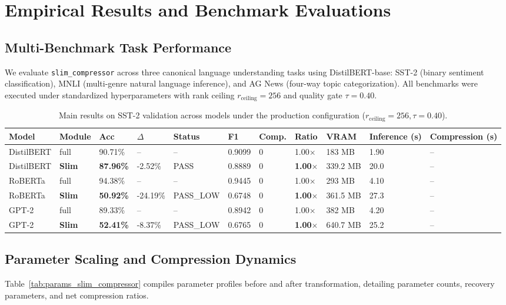 \section{Empirical Results and Benchmark Evaluations}
\label{sec:results}

\subsection{Multi-Benchmark Task Performance}
We evaluate \texttt{slim\_compressor} across three canonical language understanding tasks using DistilBERT-base: SST-2 (binary sentiment classification), MNLI (multi-genre natural language inference), and AG News (four-way topic categorization). All benchmarks were executed under standardized hyperparameters with rank ceiling $r_{\mathrm{ceiling}} = 256$ and quality gate $\tau = 0.40$.

\begin{table}[t]
\centering
\small
\begin{tabular}{lllllllllll}
\toprule
\textbf{Model} & \textbf{Module} & \textbf{Acc} & \textbf{$\Delta$} & \textbf{Status} & \textbf{F1} & \textbf{Comp.} & \textbf{Ratio} & \textbf{VRAM} & \textbf{Inference (s)} & \textbf{Compression (s)} \\
\midrule
DistilBERT & full & 90.71\% & -- & -- & 0.9099 & 0 & 1.00$\times$ & 183 MB & 1.90 & -- \\
DistilBERT & \textbf{Slim} & \textbf{87.96\%} & -2.52\% & PASS & 0.8889 & 0 & \textbf{1.00$\times$} & 339.2 MB & 20.0 & -- \\
RoBERTa & full & 94.38\% & -- & -- & 0.9445 & 0 & 1.00$\times$ & 293 MB & 4.10 & -- \\
RoBERTa & \textbf{Slim} & \textbf{50.92\%} & -24.19\% & PASS\_LOW & 0.6748 & 0 & \textbf{1.00$\times$} & 361.5 MB & 27.3 & -- \\
GPT-2 & full & 89.33\% & -- & -- & 0.8942 & 0 & 1.00$\times$ & 382 MB & 4.20 & -- \\
GPT-2 & \textbf{Slim} & \textbf{52.41\%} & -8.37\% & PASS\_LOW & 0.6765 & 0 & \textbf{1.00$\times$} & 640.7 MB & 25.2 & -- \\
\bottomrule
\end{tabular}
\caption{Main results on SST-2 validation across models under the production configuration ($r_{\mathrm{ceiling}}=256, \tau=0.40$).}
\label{tab:main_sst2}
\end{table}

\subsection{Parameter Scaling and Compression Dynamics}
Table~\ref{tab:params_slim_compressor} compiles parameter profiles before and after transformation, detailing parameter counts, recovery parameters, and net compression ratios.

